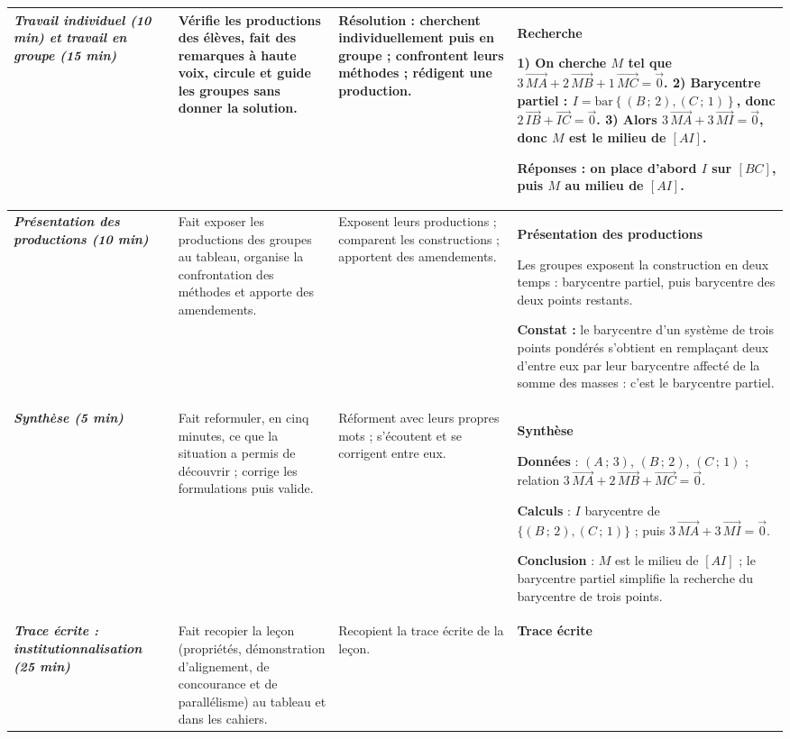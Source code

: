 \documentclass[10pt,a4paper,landscape]{article}
\newcommand{\hl}[1]{{\setlength{\fboxsep}{1.5pt}\colorbox{cJaune}{#1}}}  %
\newcommand{\vc}[1]{\overrightarrow{#1}}                                 %
\newcommand{\barG}[1]{\mathrm{bar}\left\{#1\right\}}                      %
\newcommand{\rouge}[1]{{\color{cRouge}\bfseries #1}}                      %
\newcommand{\moment}[1]{\textbf{\itshape #1}}                             %
\begin{document}
{\begin{longtable}{|J{2.12cm}|L{5.17cm}|L{4.37cm}|L{13.64cm}|}
\\
\hline
\moment{Travail individuel (10 min) et travail en groupe (15 min)} &
Vérifie les productions des élèves, fait des remarques à haute voix, circule et guide les groupes sans donner la solution. &
Résolution : cherchent individuellement puis en groupe ; confrontent leurs méthodes ; rédigent une production. &
\rouge{Recherche}

1) On cherche $M$ tel que $3\,\vc{MA}+2\,\vc{MB}+1\,\vc{MC}=\vc{0}$.
2) Barycentre partiel : $I=\barG{(B\,;\,2),(C\,;\,1)}$, donc $2\,\vc{IB}+\vc{IC}=\vc{0}$.
3) Alors $3\,\vc{MA}+3\,\vc{MI}=\vc{0}$, donc $M$ est le milieu de $[AI]$.

\textbf{Réponses} : on place d'abord $I$ sur $[BC]$, puis $M$ au milieu de $[AI]$.
\\
\hline
\moment{Pré\-sen\-ta\-tion des productions (10 min)} &
Fait exposer les productions des groupes au tableau, organise la confrontation des méthodes et apporte des amendements. &
Exposent leurs productions ; comparent les constructions ; apportent des amendements. &
\rouge{Pré\-sen\-ta\-tion des productions}

Les groupes exposent la construction en deux temps : barycentre partiel, puis barycentre des deux points restants.

\rouge{Constat :} le barycentre d'un système de trois points pondérés s'obtient en remplaçant deux d'entre eux
par leur barycentre affecté de la somme des masses : c'est le \hl{barycentre partiel}.
\\
\hline
\moment{Synthèse (5 min)} &
Fait reformuler, en cinq minutes, ce que la situation a permis de découvrir ; corrige les formulations puis valide. &
Réforment avec leurs propres mots ; s'écoutent et se corrigent entre eux. &
\rouge{Synthèse}

\textbf{Données} : $(A\,;\,3)$, $(B\,;\,2)$, $(C\,;\,1)$ ; relation $3\,\vc{MA}+2\,\vc{MB}+\vc{MC}=\vc{0}$.

\textbf{Calculs} : $I$ barycentre de $\{(B\,;\,2),(C\,;\,1)\}$ ; puis $3\,\vc{MA}+3\,\vc{MI}=\vc{0}$.

\textbf{Conclusion} : $M$ est le milieu de $[AI]$ ; le barycentre partiel simplifie la recherche du barycentre de trois points.
\\
\hline
\moment{Trace écrite : institutionnalisation (25 min)} &
Fait recopier la leçon (propriétés, démonstration d'alignement, de concourance et de parallélisme) au tableau et
dans les cahiers. &
Recopient la trace écrite de la leçon. &
\rouge{Trace écrite}


\end{longtable}}
\end{document}

